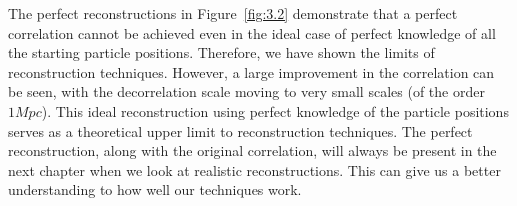 The perfect reconstructions in Figure~\ref{fig:3.2} demonstrate that a perfect correlation cannot be achieved even in the ideal case of perfect knowledge of all the starting particle positions. Therefore, we have shown the limits of reconstruction techniques. However, a large improvement in the correlation can be seen, with the decorrelation scale moving to very small scales (of the order $1 Mpc$). This ideal reconstruction using perfect knowledge of the particle positions serves as a theoretical upper limit to reconstruction techniques. The perfect reconstruction, along with the original correlation, will always be present in the next chapter when we look at realistic reconstructions. This can give us a better understanding to how well our techniques work.


    
    
